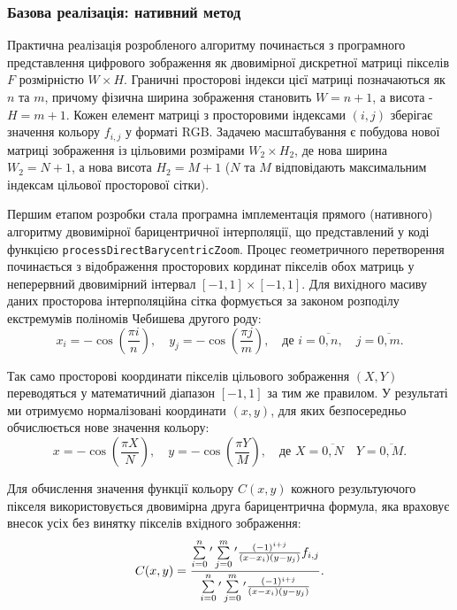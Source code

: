 \subsubsection{Базова реалізація: нативний метод}

Практична реалізація розробленого алгоритму починається з програмного представлення цифрового зображення як двовимірної дискретної матриці пікселів $F$ розмірністю $W \times H$. Граничні просторові індекси цієї матриці позначаються як $n$ та $m$, причому фізична ширина зображення становить $W = n + 1$, а висота - $H = m + 1$. Кожен елемент матриці з просторовими індексами $(i, j)$ зберігає значення кольору $f_{i,j}$ у форматі RGB. Задачею масштабування є побудова нової матриці зображення із цільовими розмірами $W_2 \times H_2$, де нова ширина $W_2 = N + 1$, а нова висота $H_2 = M + 1$ ($N$ та $M$ відповідають максимальним індексам цільової просторової сітки).

Першим етапом розробки стала програмна імплементація прямого (нативного) алгоритму двовимірної барицентричної інтерполяції, що представлений у коді функцією \texttt{processDirectBarycentricZoom}. Процес геометричного перетворення починається з відображення просторових кординат пікселів обох матриць у неперервний двовимірний інтервал $[-1, 1] \times [-1, 1]$. Для вихідного масиву даних просторова інтерполяційна сітка формується за законом розподілу екстремумів поліномів Чебишева другого роду:
\begin{equation}\label{eq:chebyshev_nodes}
	x_i = - \cos\left(\frac{\pi i}{n}\right), \quad y_j = - \cos\left(\frac{\pi j}{m}\right), \quad \text{де } i = \overline{0, n}, \quad j = \overline{0, m}.
\end{equation}

Так само просторові координати пікселів цільового зображення $(X, Y)$ переводяться у математичний діапазон $[-1, 1]$ за тим же правилом. У результаті ми отримуємо нормалізовані координати $(x, y)$, для яких безпосередньо обчислюється нове значення кольору:
\begin{equation}\label{eq:target_coordinates}
	x = - \cos\left(\frac{\pi X}{N}\right), \quad y = - \cos\left(\frac{\pi Y}{M}\right), \quad \text{де } X = \overline{0, N} \quad Y = \overline{0, M}.
\end{equation}

Для обчислення значення функції кольору $C(x, y)$ кожного результуючого пікселя використовується двовимірна друга барицентрична формула, яка враховує внесок усіх без винятку пікселів вхідного зображення:
\begin{equation}\label{eq:barycentric_2d_formula}
	C(x, y) = \frac{\sum\limits_{i=0}^{n} \vphantom{\sum}^{\prime} \sum\limits_{j=0}^{m} \vphantom{\sum}^{\prime} \frac{(-1)^{i+j}}{(x - x_i)(y - y_j)} f_{i,j}}{\sum\limits_{i=0}^{n} \vphantom{\sum}^{\prime} \sum\limits_{j=0}^{m} \vphantom{\sum}^{\prime} \frac{(-1)^{i+j}}{(x - x_i)(y - y_j)}}.
\end{equation}

